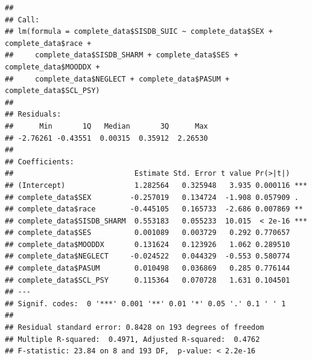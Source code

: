 \documentclass[
]{article}
\newenvironment{Shaded}{\begin{snugshade}}{\end{snugshade}}
\newcommand{\FunctionTok}[1]{\textcolor[rgb]{0.00,0.00,0.00}{#1}}
\newcommand{\NormalTok}[1]{#1}
\newcommand{\OtherTok}[1]{\textcolor[rgb]{0.56,0.35,0.01}{#1}}
\newcommand{\SpecialCharTok}[1]{\textcolor[rgb]{0.00,0.00,0.00}{#1}}
\begin{document}
\begin{Shaded}
\end{Shaded}

\begin{verbatim}
## 
## Call:
## lm(formula = complete_data$SISDB_SUIC ~ complete_data$SEX + complete_data$race + 
##     complete_data$SISDB_SHARM + complete_data$SES + complete_data$MOODDX + 
##     complete_data$NEGLECT + complete_data$PASUM + complete_data$SCL_PSY)
## 
## Residuals:
##      Min       1Q   Median       3Q      Max 
## -2.76261 -0.43551  0.00315  0.35912  2.26530 
## 
## Coefficients:
##                            Estimate Std. Error t value Pr(>|t|)    
## (Intercept)                1.282564   0.325948   3.935 0.000116 ***
## complete_data$SEX         -0.257019   0.134724  -1.908 0.057909 .  
## complete_data$race        -0.445105   0.165733  -2.686 0.007869 ** 
## complete_data$SISDB_SHARM  0.553183   0.055233  10.015  < 2e-16 ***
## complete_data$SES          0.001089   0.003729   0.292 0.770657    
## complete_data$MOODDX       0.131624   0.123926   1.062 0.289510    
## complete_data$NEGLECT     -0.024522   0.044329  -0.553 0.580774    
## complete_data$PASUM        0.010498   0.036869   0.285 0.776144    
## complete_data$SCL_PSY      0.115364   0.070728   1.631 0.104501    
## ---
## Signif. codes:  0 '***' 0.001 '**' 0.01 '*' 0.05 '.' 0.1 ' ' 1
## 
## Residual standard error: 0.8428 on 193 degrees of freedom
## Multiple R-squared:  0.4971, Adjusted R-squared:  0.4762 
## F-statistic: 23.84 on 8 and 193 DF,  p-value: < 2.2e-16
\end{verbatim}
\end{document}
